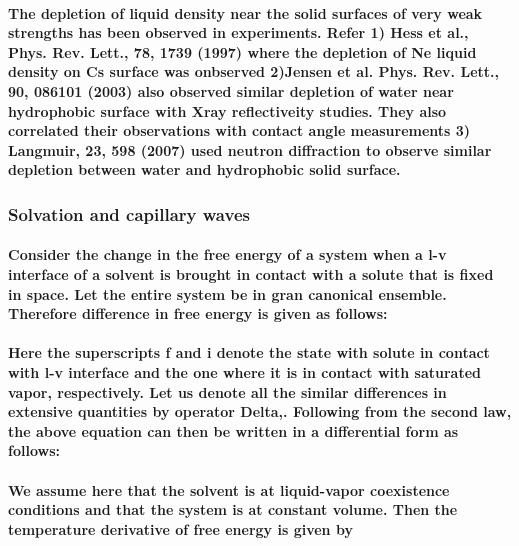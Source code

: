 \documentclass[a4paper,12pt,single,pdftex]{scrartcl}
\begin{document}
{\label{ID_3142565}\paragraph{The depletion of liquid density near the solid surfaces of very weak strengths has been observed in experiments. Refer 1) Hess et al., Phys. Rev. Lett., 78, 1739 (1997) where the depletion of Ne liquid density on Cs surface was onbserved 2)Jensen et al. Phys. Rev. Lett., 90, 086101 (2003) also observed similar depletion of water near hydrophobic surface with Xray reflectiveity studies. They also correlated their observations with contact angle measurements 3) Langmuir, 23, 598 (2007) used neutron diffraction to observe similar depletion between water and hydrophobic solid surface.}

\label{ID_19652608}\subsubsection{Solvation and capillary waves}

\label{ID_106467715}\paragraph{Consider the change in the free energy of a system when a l-v interface of a solvent is brought in contact with a solute that is fixed in space. Let the entire system be in gran canonical ensemble. Therefore difference in free energy is given as follows:}

\label{ID_1903608681}\paragraph{Here the superscripts f and i denote the state with solute in contact with l-v interface and the one where it is in contact with saturated vapor, respectively. Let us denote all the similar differences in extensive quantities by operator Delta,. Following from the second law, the above equation can then be written in a differential form as follows:}

\label{ID_1377597507}\paragraph{We assume here that the solvent is at liquid-vapor coexistence conditions and that the system is at constant volume. Then the temperature derivative of free energy is given by}

}
\end{document}
